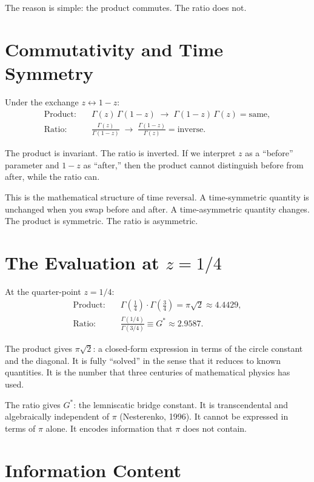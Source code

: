 \documentclass[12pt,letterpaper]{article}
\begin{document}
The reason is simple: the product commutes. The ratio does not.

\section{Commutativity and Time Symmetry}

Under the exchange $z \leftrightarrow 1-z$:
\begin{align}
\text{Product:} \quad &\Gamma(z)\,\Gamma(1-z) \;\to\; \Gamma(1-z)\,\Gamma(z) = \text{same}, \\[4pt]
\text{Ratio:} \quad &\frac{\Gamma(z)}{\Gamma(1-z)} \;\to\; \frac{\Gamma(1-z)}{\Gamma(z)} = \text{inverse}.
\end{align}

The product is invariant. The ratio is inverted. If we interpret $z$ as a ``before'' parameter and $1-z$ as ``after,'' then the product cannot distinguish before from after, while the ratio can.

This is the mathematical structure of time reversal. A time-symmetric quantity is unchanged when you swap before and after. A time-asymmetric quantity changes. The product is symmetric. The ratio is asymmetric.

\section{The Evaluation at $z = 1/4$}

At the quarter-point $z = 1/4$:
\begin{align}
\text{Product:} \quad &\Gamma\!\left(\tfrac{1}{4}\right) \cdot \Gamma\!\left(\tfrac{3}{4}\right) = \pi\sqrt{2} \approx 4.4429, \\[6pt]
\text{Ratio:} \quad &\frac{\Gamma(1/4)}{\Gamma(3/4)} \equiv G^* \approx 2.9587.
\end{align}

The product gives $\pi\sqrt{2}$: a closed-form expression in terms of the circle constant and the diagonal. It is fully ``solved'' in the sense that it reduces to known quantities. It is the number that three centuries of mathematical physics has used.

The ratio gives $G^*$: the lemniscatic bridge constant. It is transcendental and algebraically independent of $\pi$ (Nesterenko, 1996). It cannot be expressed in terms of $\pi$ alone. It encodes information that $\pi$ does not contain.

\section{Information Content}
\end{document}
